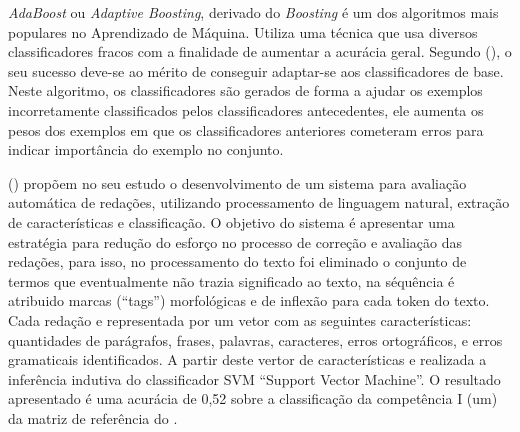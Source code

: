 \textit{AdaBoost} ou \textit{Adaptive Boosting}, derivado do \textit{Boosting} 
é um dos algoritmos mais populares no Aprendizado de Máquina. Utiliza uma 
técnica que usa diversos classificadores fracos com a finalidade de aumentar a 
acurácia geral. Segundo  
(\citeyear{dos2015detecccao}), o seu sucesso deve-se ao mérito de conseguir 
adaptar-se aos classificadores de base. Neste algoritmo, os classificadores são 
gerados de forma a ajudar os exemplos incorretamente classificados pelos 
classificadores antecedentes, ele aumenta os pesos dos exemplos em que os 
classificadores anteriores cometeram erros para indicar importância do 
exemplo no conjunto.

 (\citeyear{junior2017proposta}) propõem 
no seu estudo o desenvolvimento de um sistema para avaliação automática de 
redações, utilizando processamento de linguagem natural, extração de 
características e classificação. O objetivo do sistema é  apresentar uma 
estratégia para redução do esforço no processo de correção e avaliação das 
redações, para isso, no processamento do texto foi eliminado o conjunto de 
termos que eventualmente não trazia significado ao texto, na séquência é 
atribuido marcas (``tags'') morfológicas e de inflexão para cada token do 
texto. Cada redação e representada por um vetor com as seguintes 
características: quantidades de parágrafos, frases, palavras, caracteres, erros 
ortográficos, e erros gramaticais identificados. A partir deste vertor de 
características e realizada a inferência indutiva do classificador SVM 
``Support Vector Machine''. O resultado apresentado é uma acurácia de 0,52 
sobre a classificação da competência I (um) da matriz de referência do 
\citeauthor{edital_enem:2016}.